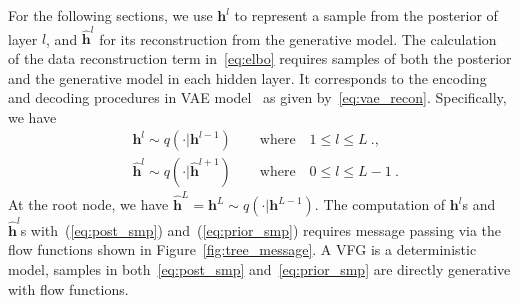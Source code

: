 \documentclass[twoside]{article}
\begin{document}
For the following sections, we use $\mathbf{h}^l$ to represent a sample from the posterior of layer $l$, and $\widehat{\mathbf{h}}^l$ for its reconstruction from the generative model. 
The calculation of the data reconstruction term in~\eqref{eq:elbo} requires  samples of both the posterior and the  generative model  in each hidden layer. It corresponds to the encoding and decoding procedures in VAE model~\cite{kingma2013auto} as given by~\eqref{eq:vae_recon}. Specifically, we have
\begin{align} \label{eq:post_smp}
 &\mathbf{h}^l \sim q(\cdot | \mathbf{h}^{l-1})  \quad \quad \textrm{where} \quad 1\leqslant l \leqslant L \ ., \\  \label{eq:prior_smp}
 &\widehat{\mathbf{h}}^l \sim q(\cdot | \widehat{\mathbf{h}}^{l+1}) \quad \quad \textrm{where} \quad 0\leqslant l \leqslant L-1 \ .
 \end{align}
At the root node,  we have $\widehat{\mathbf{h}}^L=\mathbf{h}^L \sim q(\cdot | \mathbf{h}^{L-1}) $.  The computation of $ \mathbf{h}^l$s and $\widehat{\mathbf{h}}^l$s with~(\ref{eq:post_smp}) and~(\ref{eq:prior_smp}) requires   message passing via the flow functions shown in Figure~\ref{fig:tree_message}. A VFG is a deterministic model, samples in both~\eqref{eq:post_smp} and~\eqref{eq:prior_smp}  are directly generative with flow functions.
\end{document}
